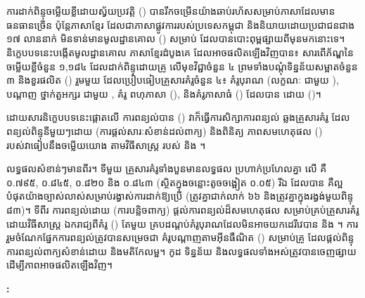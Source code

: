 \chapter*{}

\begin{khmer}
ការដាក់ពិន្ទុចម្លើយខ្លីដោយស្វ័យប្រវត្តិ () បានរីកចម្រើនយ៉ាងឆាប់រហ័សសម្រាប់ភាសាដែលមានធនធានច្រើន
ប៉ុន្តែភាសាខ្មែរ ដែលជាភាសាផ្លូវការរបស់ប្រទេសកម្ពុជា និងនិយាយដោយប្រជាជនជាង ១៧ លាននាក់
មិនទាន់មានមូលដ្ឋានគោល () សម្រាប់  ដែលបានបោះពុម្ពផ្សាយពីមុនមកនោះទេ។
និក្ខេបបទនេះបង្កើតមូលដ្ឋានគោល  ភាសាខ្មែរដំបូងគេ ដែលអាចផលិតឡើងវិញបាន៖
សារពើភ័ណ្ឌនៃចម្លើយខ្លីចំនួន ១,១៨៤ ដែលដាក់ពិន្ទុដោយគ្រូ លើមុខវិជ្ជាចំនួន ៤
ព្រមទាំងបណ្ដុំទិន្នន័យសម្អាតចំនួន ៣ និងខួរផលិត () រួមមួយ
ដែលប្រៀបធៀបគ្រួសារគំរូចំនួន ៤៖ គំរូបុរាណ (លក្ខណៈ  ជាមួយ ),
បណ្ដាញ  ថ្នាក់តួអក្សរ ជាមួយ , គំរូ  ពហុភាសា (),
និងគំរូភាសាធំ () ដែលបាន  ដោយ  ()។

ដោយសារនិក្ខេបបទនេះផ្ដោតលើ ការពន្យល់បាន () វាក៏ធ្វើការសិក្សាការពន្យល់
ឆ្លងគ្រួសារគំរូ ដែលពន្យល់ពិន្ទុនីមួយៗដោយ  (ការផ្ដល់សារៈសំខាន់ដល់ពាក្យ)
និងពិនិត្យ ភាពសមហេតុផល () របស់វាធៀបនឹងចម្លើយយោង
តាមវិធីសាស្ត្រ  របស់  និង ។

លទ្ធផលសំខាន់ៗមានពីរ។ ទីមួយ គ្រួសារគំរូទាំងបួនមានលទ្ធផល ប្រហាក់ប្រហែលគ្នា
លើ  គឺ ០.៧៩៥, ០.៨៤៥, ០.៨២០ និង ០.៨៤៣ (ស្ថិតក្នុងចន្លោះតូចចង្អៀត ០.០៥)
រីឯ  ដែលបាន  គឺល្អបំផុតយ៉ាងច្បាស់លាស់សម្រាប់រង្វាស់ការដាក់ឱ្យប្រើ
(ត្រូវគ្នាជាក់លាក់ ៦៦\en{\%} និងត្រូវគ្នាក្នុងរង្វង់មួយពិន្ទុ ៨៣\en{\%})។
ទីពីរ ការពន្យល់ដោយ  (ការបន្លិចពាក្យ) ផ្ដល់ការពន្យល់ដ៏សមហេតុផល
សម្រាប់គ្រប់គ្រួសារគំរូ ដោយវិធីសាស្ត្រ ឯករាជ្យពីគំរូ () តែមួយ
គ្របដណ្ដប់គំរូបុរាណដែលមិនអាចយកដេរីវេបាន   និង ។
ការរួមចំណែកផ្នែកការពន្យល់ត្រូវបានសម្រេចជា គំរូបណ្ដាញតាមអ៊ីនធឺណិត () សម្រាប់គ្រូ
ដែលផ្ដល់ពិន្ទុ ការពន្យល់ពាក្យសំខាន់ដោយ  និងមតិកែលម្អ។ កូដ ទិន្នន័យ និងលទ្ធផលទាំងអស់ត្រូវបានចេញផ្សាយ
ដើម្បីភាពអាចផលិតឡើងវិញ។
\end{khmer}

\vspace{0.3cm}
\noindent\textbf{:} 
  
\clearpage
